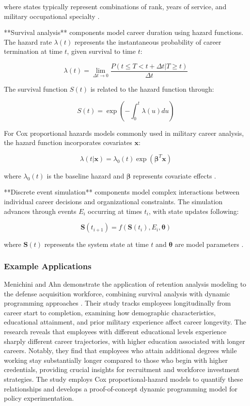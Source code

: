 \documentclass[main.tex]{subfiles}
\begin{document}
where states typically represent combinations of rank, years of service, and military occupational specialty \parencite{markov_career_progression}.

**Survival analysis** components model career duration using hazard functions. The hazard rate $\lambda(t)$ represents the instantaneous probability of career termination at time $t$, given survival to time $t$:

$$\lambda(t) = \lim_{\Delta t \to 0} \frac{P(t \leq T < t + \Delta t | T \geq t)}{\Delta t}$$

The survival function $S(t)$ is related to the hazard function through:

$$S(t) = \exp\left(-\int_0^t \lambda(u) du\right)$$

For Cox proportional hazards models commonly used in military career analysis, the hazard function incorporates covariates $\mathbf{x}$:

$$\lambda(t|\mathbf{x}) = \lambda_0(t) \exp(\boldsymbol{\beta}^T \mathbf{x})$$

where $\lambda_0(t)$ is the baseline hazard and $\boldsymbol{\beta}$ represents covariate effects \parencite{retention_analysis}.

**Discrete event simulation** components model complex interactions between individual career decisions and organizational constraints. The simulation advances through events $E_i$ occurring at times $t_i$, with state updates following:

$$\mathbf{S}(t_{i+1}) = f(\mathbf{S}(t_i), E_i, \boldsymbol{\theta})$$

where $\mathbf{S}(t)$ represents the system state at time $t$ and $\boldsymbol{\theta}$ are model parameters \parencite{eisler_allen}.

\subsubsection{Example Applications}

Menichini and Ahn demonstrate the application of retention analysis modeling to the defense acquisition workforce, combining survival analysis with dynamic programming approaches \parencite{retention_analysis}. Their study tracks employees longitudinally from career start to completion, examining how demographic characteristics, educational attainment, and prior military experience affect career longevity. The research reveals that employees with different educational levels experience sharply different career trajectories, with higher education associated with longer careers. Notably, they find that employees who attain additional degrees while working stay substantially longer compared to those who begin with higher credentials, providing crucial insights for recruitment and workforce investment strategies. The study employs Cox proportional-hazard models to quantify these relationships and develops a proof-of-concept dynamic programming model for policy experimentation.
\end{document}

